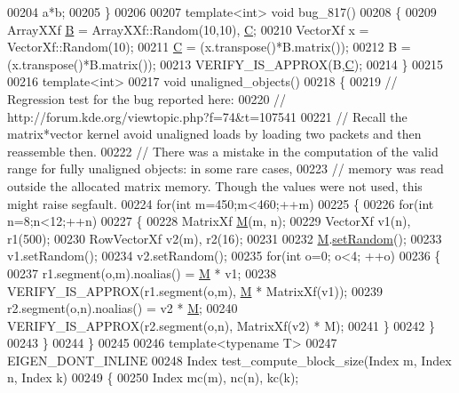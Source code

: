 \begin{DoxyCode}
00204   a*b;
00205 \}
00206 
00207 \textcolor{keyword}{template}<\textcolor{keywordtype}{int}> \textcolor{keywordtype}{void} bug\_817()
00208 \{
00209   ArrayXXf \hyperlink{group___core___module_class_eigen_1_1_matrix}{B} = ArrayXXf::Random(10,10), \hyperlink{group___core___module}{C};
00210   VectorXf x = VectorXf::Random(10);
00211   \hyperlink{group___core___module}{C} = (x.transpose()*B.matrix());
00212   B = (x.transpose()*B.matrix());
00213   VERIFY\_IS\_APPROX(B,\hyperlink{group___core___module}{C});
00214 \}
00215 
00216 \textcolor{keyword}{template}<\textcolor{keywordtype}{int}>
00217 \textcolor{keywordtype}{void} unaligned\_objects()
00218 \{
00219   \textcolor{comment}{// Regression test for the bug reported here:}
00220   \textcolor{comment}{// http://forum.kde.org/viewtopic.php?f=74&t=107541}
00221   \textcolor{comment}{// Recall the matrix*vector kernel avoid unaligned loads by loading two packets and then reassemble then.}
00222   \textcolor{comment}{// There was a mistake in the computation of the valid range for fully unaligned objects: in some rare
       cases,}
00223   \textcolor{comment}{// memory was read outside the allocated matrix memory. Though the values were not used, this might raise
       segfault.}
00224   \textcolor{keywordflow}{for}(\textcolor{keywordtype}{int} m=450;m<460;++m)
00225   \{
00226     \textcolor{keywordflow}{for}(\textcolor{keywordtype}{int} n=8;n<12;++n)
00227     \{
00228       MatrixXf \hyperlink{group___core___module_class_eigen_1_1_matrix}{M}(m, n);
00229       VectorXf v1(n), r1(500);
00230       RowVectorXf v2(m), r2(16);
00231 
00232       \hyperlink{group___core___module_class_eigen_1_1_matrix}{M}.\hyperlink{class_eigen_1_1_plain_object_base_af0e576a0e1aefc9ee346de44cc352ba3}{setRandom}();
00233       v1.setRandom();
00234       v2.setRandom();
00235       \textcolor{keywordflow}{for}(\textcolor{keywordtype}{int} o=0; o<4; ++o)
00236       \{
00237         r1.segment(o,m).noalias() = \hyperlink{group___core___module_class_eigen_1_1_matrix}{M} * v1;
00238         VERIFY\_IS\_APPROX(r1.segment(o,m), \hyperlink{group___core___module_class_eigen_1_1_matrix}{M} * MatrixXf(v1));
00239         r2.segment(o,n).noalias() = v2 * \hyperlink{group___core___module_class_eigen_1_1_matrix}{M};
00240         VERIFY\_IS\_APPROX(r2.segment(o,n), MatrixXf(v2) * M);
00241       \}
00242     \}
00243   \}
00244 \}
00245 
00246 \textcolor{keyword}{template}<\textcolor{keyword}{typename} T>
00247 EIGEN\_DONT\_INLINE
00248 Index test\_compute\_block\_size(Index m, Index n, Index k)
00249 \{
00250   Index mc(m), nc(n), kc(k);

\end{DoxyCode}
